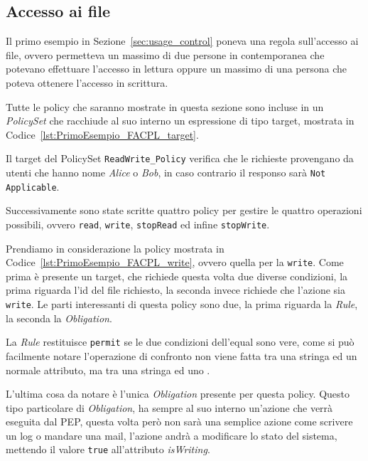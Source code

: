 \subsection{Accesso ai file} %
\label{ssub:primo_esempio}
Il primo esempio in Sezione~\ref{sec:usage_control} poneva una regola sull'accesso ai file, ovvero permetteva un massimo di due persone in contemporanea che potevano effettuare l'accesso in lettura oppure un massimo di una persona che poteva ottenere l'accesso in scrittura. \par
Tutte le policy che saranno mostrate in questa sezione sono incluse in un \textit{PolicySet} che racchiude al suo interno un espressione di tipo target, mostrata in Codice~\ref{lst:PrimoEsempio_FACPL_target}.

Il target del PolicySet \texttt{ReadWrite\_Policy} verifica che le richieste provengano da utenti che hanno nome \textit{Alice} o \textit{Bob}, in caso contrario il responso sarà \texttt{Not Applicable}. \par
Successivamente sono state scritte quattro policy per gestire le quattro operazioni possibili, ovvero \texttt{read}, \texttt{write}, \texttt{stopRead} ed infine \texttt{stopWrite}. \par
Prendiamo in considerazione la policy mostrata in Codice~\ref{lst:PrimoEsempio_FACPL_write}, ovvero quella per la \texttt{write}. Come prima è presente un target, che richiede questa volta due diverse condizioni, la prima riguarda l'id del file richiesto, la seconda invece richiede che l'azione sia \texttt{write}. Le parti interessanti di questa policy sono due, la prima riguarda la \textit{Rule}, la seconda la \textit{Obligation}. \par
La \textit{Rule} restituisce \texttt{permit} se le due condizioni dell'equal sono vere, come si può facilmente notare l'operazione di confronto non viene fatta tra una stringa ed un normale attributo, ma tra una stringa ed uno \statusattribute. \par
L'ultima cosa da notare è l'unica \textit{Obligation} presente per questa policy. Questo tipo particolare di \textit{Obligation}, ha sempre al suo interno un'azione che verrà eseguita dal PEP, questa volta però non sarà una semplice azione come scrivere un log o mandare una mail, l'azione andrà a modificare lo stato del sistema, mettendo il valore \texttt{true} all'attributo \textit{isWriting}.

